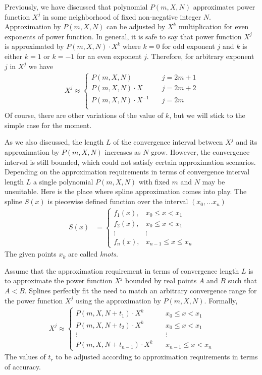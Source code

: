 ﻿Previously, we have discussed that polynomial $P(m,X,N)$ approximates power function $X^j$
in some neighborhood of fixed non-negative integer $N$.
Approximation by $P(m,X,N)$ can be adjusted by $X^k$ multiplication for even exponents of power function.
In general, it is safe to say that power function $X^j$ is approximated by $P(m,X,N) \cdot X^k$
where $k=0$ for odd exponent $j$ and $k$ is either $k=1$ or $k=-1$ for an even exponent $j$.
Therefore, for arbitrary exponent $j$ in $X^j$ we have
\begin{align*}
    X^j \approx
    \begin{cases}
        P(m,X,N) \quad         & j=2m+1 \\
        P(m,X,N) \cdot X \quad & j=2m+2 \\
        P(m,X,N) \cdot X^{-1} \quad & j=2m \\
    \end{cases}
\end{align*}
Of course, there are other variations of the value of $k$, but we will stick to the simple case for the moment.

As we also discussed, the length $L$ of the convergence interval between $X^j$ and its approximation by $P(m,X,N)$
increases as $N$ grow.
However, the convergence interval is still bounded, which could not satisfy certain approximation scenarios.
Depending on the approximation requirements in terms of convergence interval length $L$ a single polynomial $P(m,X,N)$
with fixed $m$ and $N$ may be unsuitable.
Here is the place where spline approximation comes into play.
The spline $S(x)$ is piecewise defined function over the interval $(x_0, \ldots x_n)$
\begin{align*}
    S(x) &=
    \begin{cases}
        f_1(x), & x_0 \leq x < x_1 \\
        f_2(x), & x_0 \leq x < x_1\\
        \vdots & \vdots \\
        f_n(x), & x_{n-1} \leq x \leq x_n
    \end{cases}
\end{align*}
The given points $x_k$ are called \textit{knots}.

Assume that the approximation requirement in terms of convergence length $L$ is to approximate the power function $X^j$
bounded by real points $A$ and $B$ such that $A < B$.
Splines perfectly fit the need to match an arbitrary convergence range for the power function $X^j$ using the
approximation by $P(m,X,N)$.
Formally,
\begin{align*}
    X^j \approx
    \begin{cases}
        P(m,X,N+t_1) \cdot X^{k} \quad & x_0 \leq x < x_1 \\
        P(m,X,N+t_2) \cdot X^{k} \quad & x_0 \leq x < x_1 \\
        \vdots & \vdots \\
        P(m,X,N+t_{n-1}) \cdot X^{k} \quad & x_{n-1} \leq x < x_n
    \end{cases}
\end{align*}
The values of $t_r$ to be adjusted according to approximation requirements in terms of accuracy.
